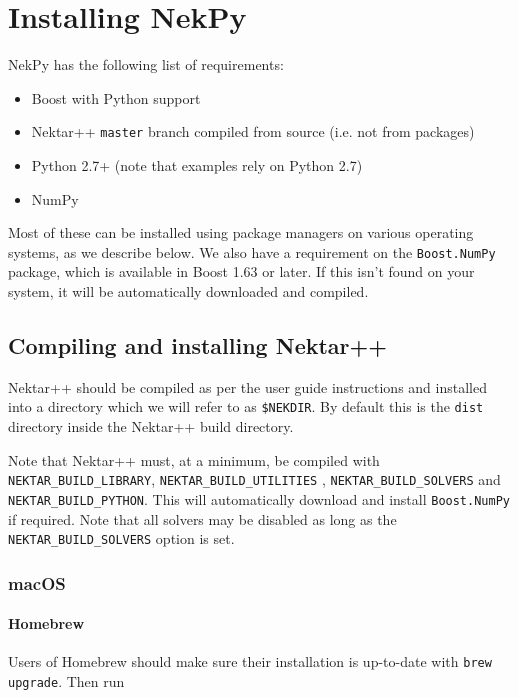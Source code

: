 \chapter{Installing NekPy}

NekPy has the following list of requirements:

\begin{itemize}
	\item Boost with Python support
	\item Nektar++ \texttt{master} branch compiled from source (i.e. not from packages)
	\item Python 2.7+ (note that examples rely on Python 2.7)
	\item NumPy
\end{itemize}

Most of these can be installed using package managers on various operating
systems, as we describe below. We also have a requirement on the \texttt{Boost.NumPy}
package, which is available in Boost 1.63 or later. If this isn't found on your
system, it will be automatically downloaded and compiled.

\section{Compiling and installing Nektar++}

Nektar++ should be compiled as per the user guide instructions and installed
into a directory which we will refer to as \texttt{\$NEKDIR}. By default this is the
\texttt{dist} directory inside the Nektar++ build directory.

Note that Nektar++ must, at a minimum, be compiled with \texttt{NEKTAR\_BUILD\_LIBRARY},
\texttt{NEKTAR\_BUILD\_UTILITIES} , \texttt{NEKTAR\_BUILD\_SOLVERS} and \texttt{NEKTAR\_BUILD\_PYTHON}. 
This will automatically download and install \texttt{Boost.NumPy} if required. Note 
that all solvers may be disabled as long as the \texttt{NEKTAR\_BUILD\_SOLVERS} option is set. 

\subsection{macOS}

\subsubsection{Homebrew}

Users of Homebrew should make sure their installation is up-to-date with 
\texttt{brew upgrade}. Then run

